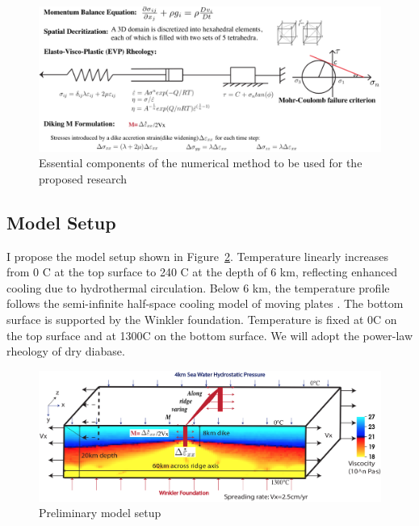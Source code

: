 \documentclass[12pt]{article}
\begin{document}
\begin{figure}[H]
 \centering
  \includegraphics[width=1.0\textwidth]{fig7_2.png}
 \caption{\small{Essential components of the numerical method to be used for the proposed research}}
 \label{fig7_1}
\end{figure}

\subsection{Model Setup}

I propose the model setup shown in Figure~\ref{fig8_1}. Temperature linearly increases from 0 \degree C at the top surface to 240 \degree C at the depth of 6 km, reflecting enhanced cooling due to hydrothermal circulation. Below 6 km, the temperature profile follows the semi-infinite half-space cooling model of moving plates \citep[e.g.,][]{Turcotte2002}.   The bottom surface is supported by the Winkler foundation. Temperature is fixed at 0\degree C on the top surface and at 1300\degree C on the bottom surface. We will adopt the power-law rheology of dry diabase\citep[e.g.,][]{Kirby1987, Buck2005}. 

\begin{figure}[H]
 \centering
  \includegraphics[scale=0.55]{fig8_2.png}
 \caption{\small Preliminary model setup}
 \label{fig8_1}
\end{figure}
\end{document}
